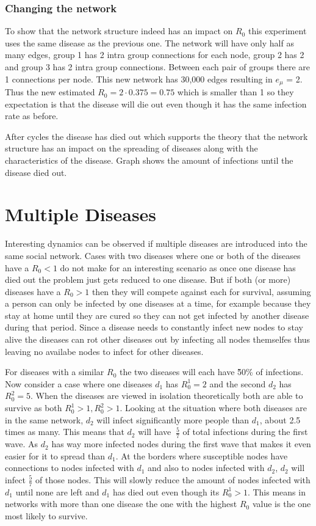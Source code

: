 \subsubsection{Changing the network}
To show that the network structure indeed has an impact on $R_0$ this experiment
uses the same disease as the previous one. The network will have only half as many
edges, group 1 has 2 intra group connections for each node, group 2 has 2 and
group 3 has 2 intra group connections. Between each pair of groups there are
1 connections per node. This new network has 30,000 edges resulting in $e_\mu$ = 2.
Thus the new estimated $R_0=2\cdot0.375=0.75$ which is smaller than 1 so they
expectation is that the disease will die out even though it has the same infection 
rate as before.

After %
cycles the disease has died out which supports the theory that the network structure
has an impact on the spreading of diseases along with the characteristics of the disease.
Graph %
shows the amount of infections until the disease died out.

\section{Multiple Diseases}
Interesting dynamics can be observed if multiple diseases are introduced into the same
social network. Cases with two diseases where one or both of the diseases have a $R_0 < 1$
do not make for an interesting scenario as once one disease has died out the problem just
gets reduced to one disease. But if both (or more) diseases have a $R_0 > 1$ then they 
will compete against each for survival, assuming a person can only be infected by one diseases
at a time, for example because they stay at home until they are cured so they can not get
infected by another disease during that period. Since a disease needs to constantly infect
new nodes to stay alive the diseases can rot other diseases out by infecting all nodes themselfes
thus leaving no availabe nodes to infect for other diseases.

For diseases with a similar $R_0$ the two diseases will each have \~50\% of infections.
Now consider a case where one diseases $d_1$ has $R_0^1=2$ and the second $d_2$ has $R_0^2=5$.
When the diseases are viewed in isolation theoretically both are able to survive as both
$R_0^1 > 1, R_0^2>1$. Looking at the situation where both diseases are in the same network,
$d_2$ will infect significantly more people than $d_1$, about 2.5 times as many. This means
that $d_2$ will have $~\frac{5}{7}$ of total infections during the first wave. As $d_2$ has
way more infected nodes during the first wave that makes it even easier for it to spread than
$d_1$. At the borders where susceptible nodes have connections to nodes infected with $d_1$
and also to nodes infected with $d_2$, $d_2$ will infect $\frac{5}{7}$ of those nodes. This
will slowly reduce the amount of nodes infected with $d_1$ until none are left and $d_1$ has died
out even though its $R_0^1>1$. This means in networks with more than one disease the one 
with the highest $R_0$ value is the one most likely to survive.

